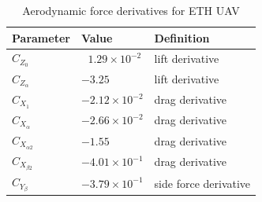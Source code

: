 \begin{table}
\label{arm:forcesETHcraft}
\caption{Aerodynamic force derivatives for ETH UAV \cite{ducard2009fault}}
\label{arm:ethcraft}
\begin{center}
\begin{tabular}{ ||p{3cm}|p{3cm}|p{4cm}||}\hline
\textbf{Parameter} & \textbf{Value} & \textbf{Definition} \\\hline
$C_{Z_0}$                             & $\ \ \,1.29 \times 10^{-2}$	   & lift derivative \\\hline
$C_{Z_{\alpha}}$                   & $-3.25 $                                 & lift derivative \\\hline
$C_{X_1}$                             & $-2.12 \times 10^{-2}$	   & drag derivative \\\hline
$C_{X_{\alpha}}$                   & $-2.66 \times 10^{-2}$          & drag derivative \\\hline
$C_{X_{\alpha 2}}$                & $-1.55 $	                            & drag derivative \\\hline
$C_{X_{\beta 2}} $                 & $-4.01 \times 10^{-1}$	   & drag derivative \\\hline
$C_{Y_\beta} $                      & $-3.79 \times 10^{-1}$          & side force derivative \\\hline
\end{tabular}
\end{center}
\end{table}


